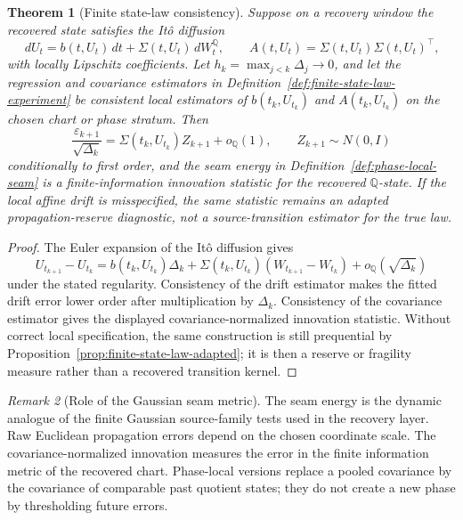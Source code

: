 \documentclass[11pt,a4paper]{amsart}
\theoremstyle{plain}
\newtheorem{theorem}{Theorem}[section]
\theoremstyle{definition}
\theoremstyle{remark}
\newtheorem{remark}[theorem]{Remark}
\newcommand{\QQ}{\mathbb{Q}}
\newcommand{\dd}{\,d}
\begin{document}
\begin{theorem}[Finite state-law consistency]\label{thm:finite-state-law-consistency}
Suppose on a recovery window the recovered state satisfies the It\^o diffusion
\[
        \dd U_t=b(t,U_t)\dd t+\Sigma(t,U_t)\dd W_t^\QQ,
        \qquad A(t,U_t)=\Sigma(t,U_t)\Sigma(t,U_t)^\top ,
\]
with locally Lipschitz coefficients.  Let \(h_k=\max_{j<k}\Delta_j\to0\), and let the regression
and covariance estimators in Definition~\ref{def:finite-state-law-experiment} be consistent local
estimators of \(b(t_k,U_{t_k})\) and \(A(t_k,U_{t_k})\) on the chosen chart or phase stratum.
Then
\[
        \frac{\varepsilon_{k+1}}{\sqrt{\Delta_k}}
        =
        \Sigma(t_k,U_{t_k})Z_{k+1}+o_{\QQ}(1),
        \qquad Z_{k+1}\sim N(0,I)
\]
conditionally to first order, and the seam energy in
Definition~\ref{def:phase-local-seam} is a finite-information innovation statistic for the
recovered \(\QQ\)-state.  If the local affine drift is misspecified, the same statistic remains
an adapted propagation-reserve diagnostic, not a source-transition estimator for the true law.
\end{theorem}

\begin{proof}
The Euler expansion of the It\^o diffusion gives
\[
        U_{t_{k+1}}-U_{t_k}
        =
        b(t_k,U_{t_k})\Delta_k
        +
        \Sigma(t_k,U_{t_k})(W_{t_{k+1}}-W_{t_k})
        +
        o_{\QQ}(\sqrt{\Delta_k})
\]
under the stated regularity.  Consistency of the drift estimator makes the fitted drift error
lower order after multiplication by \(\Delta_k\).  Consistency of the covariance estimator gives
the displayed covariance-normalized innovation statistic.  Without correct local specification,
the same construction is still prequential by Proposition~\ref{prop:finite-state-law-adapted};
it is then a reserve or fragility measure rather than a recovered transition kernel.
\end{proof}

\begin{remark}[Role of the Gaussian seam metric]\label{rem:gaussian-seam-state-law}
The seam energy is the dynamic analogue of the finite Gaussian source-family tests used in the
recovery layer.  Raw Euclidean propagation errors depend on the chosen coordinate scale.  The
covariance-normalized innovation measures the error in the finite information metric of the
recovered chart.  Phase-local versions replace a pooled covariance by the covariance of comparable
past quotient states; they do not create a new phase by thresholding future errors.
\end{remark}
\end{document}
